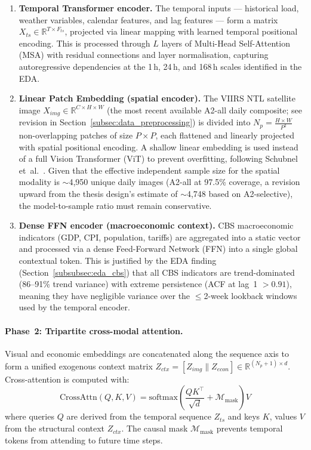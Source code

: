 \begin{enumerate}
    \item \textbf{Temporal Transformer encoder.} The temporal inputs --- historical load, weather variables, calendar features, and lag features --- form a matrix $X_{ts} \in \mathbb{R}^{T \times F_{ts}}$, projected via linear mapping with learned temporal positional encoding. This is processed through $L$ layers of Multi-Head Self-Attention (MSA) with residual connections and layer normalisation, capturing autoregressive dependencies at the 1\,h, 24\,h, and 168\,h scales identified in the EDA.

    \item \textbf{Linear Patch Embedding (spatial encoder).} The VIIRS NTL satellite image $X_{img} \in \mathbb{R}^{C \times H \times W}$ (the most recent available A2-all daily composite; see revision in Section~\ref{subsec:data_preprocessing}) is divided into $N_p = \frac{H \times W}{P^2}$ non-overlapping patches of size $P \times P$, each flattened and linearly projected with spatial positional encoding. A shallow linear embedding is used instead of a full Vision Transformer (ViT) to prevent overfitting, following Schubnel et~al.~\cite{schubnel_solarcrossformer_2025}. Given that the effective independent sample size for the spatial modality is $\sim$4{,}950 unique daily images (A2-all at 97.5\% coverage, a revision upward from the thesis design's estimate of $\sim$4{,}748 based on A2-selective), the model-to-sample ratio must remain conservative.

    \item \textbf{Dense FFN encoder (macroeconomic context).} CBS macroeconomic indicators (GDP, CPI, population, tariffs) are aggregated into a static vector and processed via a dense Feed-Forward Network (FFN) into a single global contextual token. This is justified by the EDA finding (Section~\ref{subsubsec:eda_cbs}) that all CBS indicators are trend-dominated (86--91\% trend variance) with extreme persistence (ACF at lag~1 $> 0.91$), meaning they have negligible variance over the $\leq$2-week lookback windows used by the temporal encoder.
\end{enumerate}

\paragraph{Phase~2: Tripartite cross-modal attention.}
Visual and economic embeddings are concatenated along the sequence axis to form a unified exogenous context matrix $Z_{ctx} = [Z_{img} \parallel Z_{econ}] \in \mathbb{R}^{(N_p + 1) \times d}$. Cross-attention is computed with:
\begin{equation}
    \text{CrossAttn}(Q, K, V) = \text{softmax}\!\left(\frac{Q K^\top}{\sqrt{d}} + \mathcal{M}_{\text{mask}}\right) V
\end{equation}
where queries $Q$ are derived from the temporal sequence $Z_{ts}$ and keys $K$, values $V$ from the structural context $Z_{ctx}$. The causal mask $\mathcal{M}_{\text{mask}}$ prevents temporal tokens from attending to future time steps.

